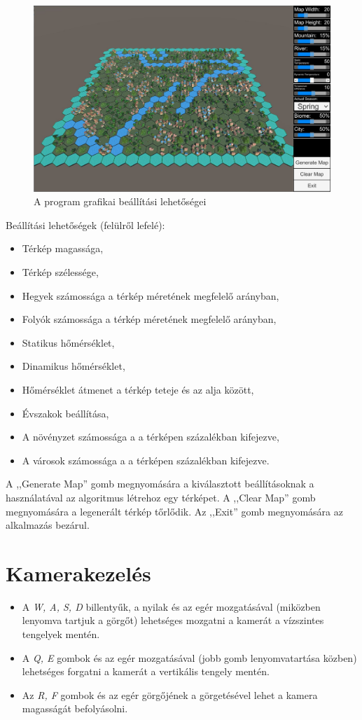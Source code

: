 \begin{figure}[h!]
\centering
\includegraphics[scale=0.215]{kepek/UserGuide2.jpg}
\caption{A program grafikai beállítási lehetőségei}
\label{fig:UserGuide2}
\end{figure}

Beállítási lehetőségek (felülről lefelé):
\begin{itemize}
\item Térkép magassága,
\item Térkép szélessége,
\item Hegyek számossága a térkép méretének megfelelő arányban,
\item Folyók számossága a térkép méretének megfelelő arányban,
\item Statikus hőmérséklet,
\item Dinamikus hőmérséklet,
\item Hőmérséklet átmenet a térkép teteje és az alja között,
\item Évszakok beállítása,
\item A növényzet számossága a a térképen százalékban kifejezve,
\item A városok számossága a a térképen százalékban kifejezve.
\end{itemize}

A ,,Generate Map'' gomb megnyomására a kiválasztott beállításoknak a használatával az algoritmus létrehoz egy térképet. A ,,Clear Map'' gomb megnyomására a legenerált térkép tőrlődik. Az ,,Exit'' gomb megnyomására az alkalmazás bezárul.

\section*{Kamerakezelés}

\begin{itemize}
\item A \textit{W, A, S, D} billentyűk, a nyilak és az egér mozgatásával (miközben lenyomva tartjuk a görgőt) lehetséges mozgatni a kamerát a vízszintes tengelyek mentén.
\item A \textit{Q, E} gombok és az egér mozgatásával (jobb gomb lenyomvatartása közben) lehetséges forgatni a kamerát a vertikális tengely mentén.
\item Az \textit{R, F} gombok és az egér görgőjének a görgetésével lehet a kamera magasságát befolyásolni.
\end{itemize}
